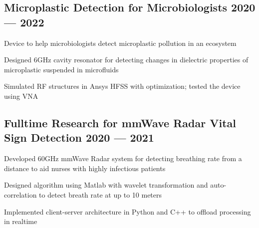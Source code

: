 \documentclass[letter,10pt]{article}
\begin{document}

\subsection{{Microplastic Detection for Microbiologists \hfill 2020 --- 2022}}
\begin{zitemize}
\item Device to help microbiologists detect microplastic pollution in an ecosystem
\item Designed 6GHz cavity resonator for detecting changes in dielectric properties of microplastic suspended in microfluids
\item Simulated RF structures in Ansys HFSS with optimization; tested the device using VNA
\end{zitemize}
{\color{sectiondivide} \vspace{-0.75em}\hrulefill}

\subsection{{Fulltime Research for mmWave Radar Vital Sign Detection \hfill 2020 --- 2021}}
\begin{zitemize}
\item Developed 60GHz mmWave Radar system for detecting breathing rate from a distance to aid nurses with highly infectious patients
\item Designed algorithm using Matlab with wavelet transformation and auto-correlation to detect breath rate at up to 10 meters
\item Implemented client-server architecture in Python and C++ to offload processing in realtime
\end{zitemize}
\end{document}
